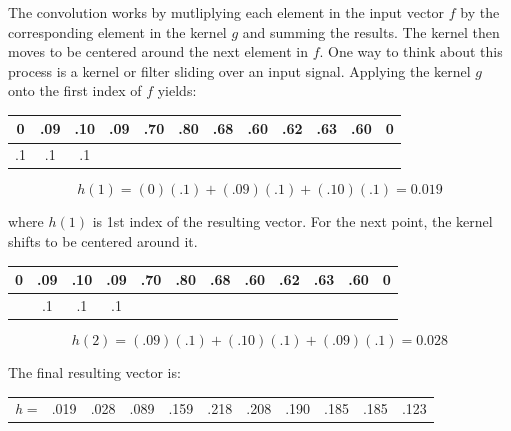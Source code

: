 \noindent The convolution works by mutliplying each element in the input vector $ f $ by the corresponding element in the kernel $ g $ and summing the results. The kernel then moves to be centered around the next element in $ f $. One way to think about this process is a kernel or filter sliding over an input signal. Applying the kernel $ g $ onto the first index of $ f $ yields: 

\begin{table}[h!]
    \centering
    \begin{tabular}{|c|c|c|c|c|c|c|c|c|c|c|c|}
    \hline
    0  & .09 & .10 & .09 & .70 & \multicolumn{1}{c|}{.80} & \multicolumn{1}{c|}{.68} & \multicolumn{1}{c|}{.60} & .62 & .63 & .60 & 0 \\ \hline
    .1 & .1  & .1  &     &     &                          &                          &                          &     &     &     &   \\ \hline
    \end{tabular}
\end{table}
$$ 
h(1) = (0)(.1) + (.09)(.1) + (.10)(.1) = 0.019
$$

\noindent where $ h(1) $ is 1st index of the resulting vector. For the next point, the kernel shifts to be centered around it. 

\begin{table}[h!]
    \centering
    \begin{tabular}{|c|c|c|c|c|c|c|c|c|c|c|c|}
    \hline
    0 & .09 & .10 & .09 & .70 & \multicolumn{1}{c|}{.80} & \multicolumn{1}{c|}{.68} & \multicolumn{1}{c|}{.60} & .62 & .63 & .60 & 0 \\ \hline
      & .1  & .1  & .1  &     &                          &                          &                          &     &     &     &   \\ \hline
    \end{tabular}
\end{table}

$$ 
h(2) = (.09)(.1) + (.10)(.1) + (.09)(.1) = 0.028
$$

\noindent The final resulting vector is:

\begin{table}[h!]
    \centering
    \begin{tabular}{c|c|c|c|c|c|c|c|c|c|c|}
    \cline{2-11}
    \textit{h} = & .019 & .028 & .089 & .159 & .218 & .208 & .190 & .185 & .185 & .123 \\ \cline{2-11} 
    \end{tabular}
\end{table}

